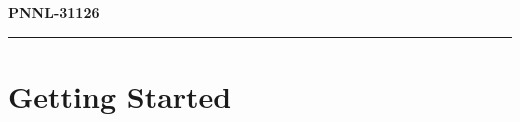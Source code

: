 \documentclass[11pt]{report}
\begin{document}
\pagestyle{empty}
\hfill{\large{\bf PNNL-31126}}


\vspace*{2in}
{}

\vspace*{8pt}
\hrule
\vspace*{8pt}



\newpage


\newpage

\tableofcontents






\chapter{Getting Started}\label{chap:getting_started}











%

\begin{appendices}



\end{appendices}



\end{document}
